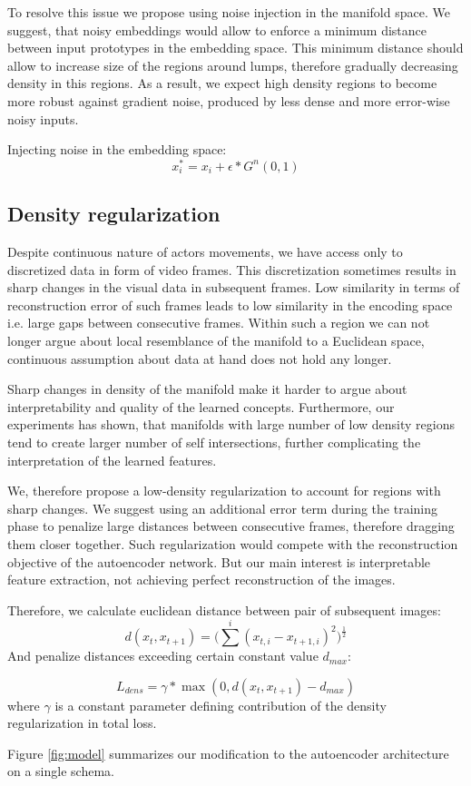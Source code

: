 To resolve this issue we propose using noise injection in the manifold space.
We suggest, that noisy embeddings would allow to enforce a minimum distance between input prototypes in the embedding space.
This minimum distance should allow to increase size of the regions around lumps, therefore gradually decreasing density in this regions.
As a result, we expect high density regions to become more robust against gradient noise, produced by less dense and more error-wise noisy inputs.

Injecting noise in the embedding space:
\begin{equation}
  x_i^* = x_i + \epsilon*G^n(0, 1)
\end{equation}

\subsection{Density regularization}

Despite continuous nature of actors movements, we have access only to discretized data in form of video frames.
This discretization sometimes results in sharp changes in the visual data in subsequent frames.
Low similarity in terms of reconstruction error of such frames leads to low similarity in the encoding space i.e. large gaps between consecutive frames.
Within such a region we can not longer argue about local resemblance of the manifold to a Euclidean space, continuous assumption about data at hand does not hold any longer.

Sharp changes in density of the manifold make it harder to argue about interpretability and quality of the learned concepts.
Furthermore, our experiments has shown, that manifolds with large number of low density regions tend to create larger number of self intersections, further complicating the interpretation of the learned features.

We, therefore propose a low-density regularization to account for regions with sharp changes.
We suggest using an additional error term during the training phase to penalize large distances between consecutive frames, therefore dragging them closer together.
Such regularization would compete with the reconstruction objective of the autoencoder network.
But our main interest is interpretable feature extraction, not achieving perfect reconstruction of the images.

Therefore, we calculate euclidean distance between pair of subsequent images:
\begin{equation*}
d(x_t, x_{t+1}) = \Big(\sum^i { (x_{t,i}-x_{t+1, i})^2}\Big)^{\frac{1}{2}}
\end{equation*}
And penalize distances exceeding certain constant value $d_{max}$:

\begin{equation*}
  L_{dens} = \gamma*\max(0, d(x_t, x_{t+1})-d_{max})
\end{equation*}
where $\gamma$ is a constant parameter defining contribution of the density regularization in total loss.


Figure \ref{fig:model} summarizes our modification to the autoencoder architecture on a single schema.


